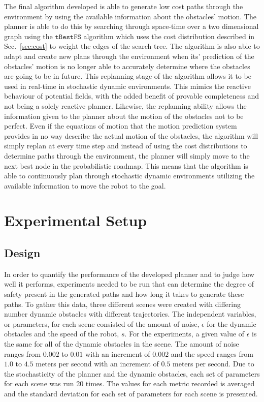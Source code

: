 \documentclass[letterpaper, 10pt, conference]{ieeeconf}
\newcommand{\Acronym}[1]{\ensuremath{{{\texttt{#1}}}}}
\begin{document}
The final algorithm developed is able to generate low cost paths through the
environment by using the available information about the obstacles' motion. The
planner is able to do this by searching through space-time over a two
dimensional graph using the $\Acronym{tBestFS}$ algorithm which uses the cost
distribution described in Sec.~\ref{sec:cost} to weight the edges of the search
tree. The algorithm is also able to adapt and create new plans through the
environment when its' prediction of the obstacles' motion is no longer able to
accurately determine where the obstacles are going to be in future. This
replanning stage of the algorithm allows it to be used in real-time in
stochastic dynamic environments. This mimics the reactive behaviour of
potential fields, with the added benefit of provable completeness and not being
a solely reactive planner. Likewise, the replanning ability allows the
information given to the planner about the motion of the obstacles not to be
perfect. Even if the equations of motion that the motion prediction system
provides in no way describe the actual motion of the obstacles, the algorithm
will simply replan at every time step and instead of using the cost
distributions to determine paths through the environment, the planner will
simply move to the next best node in the probabilistic roadmap. This means that
the algorithm is able to continuously plan through stochastic dynamic
environments utilizing the available information to move the robot to the goal.

\section{Experimental Setup}

\label{chapter:experimentalsetup}

\subsection{Design}

In order to quantify the performance of the developed planner and to judge how
well it performs, experiments needed to be run that can determine the degree of
safety present in the generated paths and how long it takes to generate these
paths. To gather this data, three different scenes were created with differing
number dynamic obstacles with different trajectories. The independent
variables, or parameters, for each scene consisted of the amount of noise,
$\epsilon$ for the dynamic obstacles and the speed of the robot, $s$. For the
experiments, a given value of $\epsilon$ is the same for all of the dynamic
obstacles in the scene. The amount of noise ranges from $0.002$ to $0.01$ with
an increment of $0.002$ and the speed ranges from $1.0$ to $4.5$ meters per
second with an increment of $0.5$ meters per second. Due to the stochasticity
of the planner and the dynamic obstacles, each set of parameters for each scene
was run 20 times. The values for each metric recorded is averaged and the
standard deviation for each set of parameters for each scene is presented.
\end{document}
